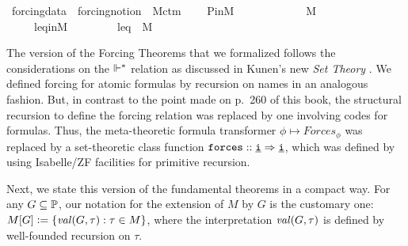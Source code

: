 \begin{isabelle}
\isamarkupfalse%
\ forcing{\isacharunderscore}{\kern0pt}data{}\ {\isacharequal}{\kern0pt}\ forcing{\isacharunderscore}{\kern0pt}notion\ {\isacharplus}{\kern0pt}\ M{\isacharunderscore}{\kern0pt}ctm{}\ {\isacharplus}{\kern0pt}\isanewline
\ \ \ P{\isacharunderscore}{\kern0pt}in{\isacharunderscore}{\kern0pt}M{\isacharcolon}{\kern0pt}\ \ \ \ \ \ \ \ \ \ \ {\isachardoublequoteopen}{\isasymbbbP}\ {\isasymin}\ M{\isachardoublequoteclose}\isanewline
\ \ \ \ \ leq{\isacharunderscore}{\kern0pt}in{\isacharunderscore}{\kern0pt}M{\isacharcolon}{\kern0pt}\ \ \ \ \ \ \ \ \ {\isachardoublequoteopen}leq\ {\isasymin}\ M{\isachardoublequoteclose}
\end{isabelle}
The version of the Forcing Theorems that we formalized follows the
considerations on the $\Vdash^*$ relation as discussed in Kunen's new
\emph{Set Theory}
\cite[p.~257ff]{kunen2011set}.
We defined forcing for atomic formulas by recursion on names in an
analogous fashion. But, in contrast to the point made on
p.~260 of this book, the structural recursion to define the forcing
relation was replaced by one  involving codes for formulas. Thus, the meta-theoretic formula
transformer $\phi\mapsto\mathit{Forces}_\phi$ was replaced by a
set-theoretic class function $\forceisa:: \tyi \fun \tyi$, which was defined by using
Isabelle/ZF facilities for primitive recursion.

Next, we state this version of the fundamental theorems in a compact
way. For any $G\subseteq \mathbb{P}$, our notation for the extension of $M$ by
$G$ is the  customary one: $M[G]\mathrel{\mathop:}=
\{ \operatorname{\mathit{val}}(G,\tau) : \tau\in M \}$, where the interpretation
$\operatorname{\mathit{val}}(G,\tau)$ is defined by well-founded recursion on
$\tau$.

